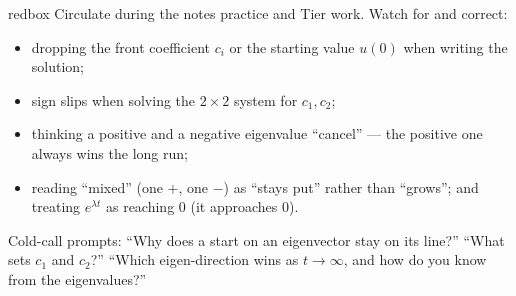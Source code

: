 \documentclass[10pt]{article}
\begin{document}
\begin{skillbox}{redbox}
Circulate during the notes practice and Tier work. Watch for and correct:
\begin{itemize}[leftmargin=1.2em, nosep]
  \item dropping the front coefficient $c_i$ or the starting value $u(0)$ when writing the solution;
  \item sign slips when solving the $2\times2$ system for $c_1,c_2$;
  \item thinking a positive and a negative eigenvalue ``cancel'' --- the positive one always wins the long run;
  \item reading ``mixed'' (one $+$, one $-$) as ``stays put'' rather than ``grows''; and treating $e^{\lambda t}$ as reaching $0$ (it approaches $0$).
\end{itemize}
Cold-call prompts: ``Why does a start on an eigenvector stay on its line?'' ``What sets $c_1$ and $c_2$?''
``Which eigen-direction wins as $t\to\infty$, and how do you know from the eigenvalues?''
\end{skillbox}
\end{document}
